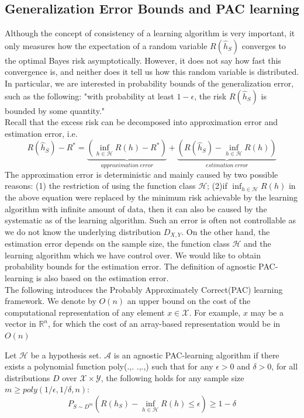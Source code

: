 \subsection{Generalization Error Bounds and PAC learning}
Although the concept of consistency of a learning algorithm is very important, it only measures how the expectation of a random variable $R(\hat{h}_S)$ converges to the optimal Bayes risk asymptotically. However, it does not say how fast this convergence is, and neither does it tell us how this random variable is distributed. In particular, we are interested in probability bounds of the generalization error, such as the following: "with
probability at least $1-\epsilon$, the risk $R(\hat{h}_S)$ is bounded by some quantity."\\
Recall that the excess risk can be decomposed into approximation error and estimation error, i.e.
\begin{equation}
R(\hat{h}_S)-R^* = \underbrace{\left( \inf_{h \in \mathcal{H}} R(h)-R^* \right)}_{approximation\ error} + \underbrace{\left( R(\hat{h}_S)-\inf_{h \in \mathcal{H}} R(h) \right)}_{estimation\ error}
\end{equation}
The approximation error is deterministic and mainly caused by two possible reasons: (1) the restriction
of using the function class $\mathcal{H}$; (2)if $\inf_{h \in \mathcal{H}} R(h)$ in the above equation were replaced by the minimum risk achievable by the learning algorithm with infinite amount of data, then it can also be caused by the systematic
as of the learning algorithm. Such an error is often not controllable as we do not know the underlying distribution $D_{X,Y}$. On the other hand, the estimation error depends on the sample size, the function class $\mathcal{H}$ and the learning algorithm which we have control over. We would like to obtain probability bounds for
the estimation error. The definition of agnostic PAC-learning is also based on the estimation error.\\

\noindent The following introduces the Probably Approximately Correct(PAC) learning framework. We denote by $O(n)$ an upper bound on the cost of the computational representation of any element $x \in \mathcal{X}$. For example, $x$ may be a vector in $\mathbb{R}^n$, for which the cost of an array-based representation would be in $O(n)$
\begin{definition}
	Let $\mathcal{H}$ be a hypothesis set. $\mathcal{A}$ is an agnostic PAC-learning algorithm if there exists a polynomial function poly(.,. .,.,) such that for any $\epsilon > 0$ and $\delta > 0$, for all distributions $D$ over $\mathcal{X} \times \mathcal{Y}$, the following holds for any sample size $m \geq poly(1/\epsilon, 1/\delta, n)$:
	\begin{equation}
	P_{S \sim D^m} \left( R(h_S)-\inf_{h \in \mathcal{H}} R(h) \leq \epsilon \right) \geq 1-\delta
	\end{equation} 
\end{definition}

